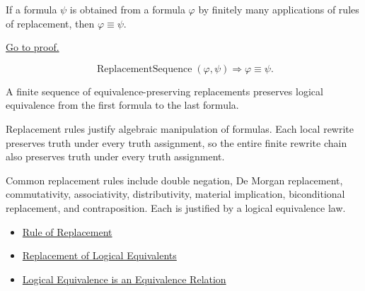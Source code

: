 \begin{tcolorbox}[colback=thmbox, colframe=thmborder, arc=2pt,
  left=6pt, right=6pt, top=4pt, bottom=4pt,
  title={\small\textbf{Theorem (Replacement Rules Preserve Logical Equivalence)}},
  fonttitle=\small\bfseries]
\begin{theorem}
\label{thm:replacement-rules-preserve-logical-equivalence-propositional-logic}
If a formula \(\psi\) is obtained from a formula \(\varphi\) by finitely many
applications of rules of replacement, then \(\varphi\equiv\psi\).

\noindent\hyperref[prf:replacement-rules-preserve-logical-equivalence-propositional-logic]{Go to proof.}
\end{theorem}
\end{tcolorbox}

\begin{remark*}
\[
\operatorname{ReplacementSequence}(\varphi,\psi)
\Longrightarrow
\varphi\equiv\psi.
\]
\end{remark*}

\begin{remark*}
A finite sequence of equivalence-preserving replacements preserves logical
equivalence from the first formula to the last formula.
\end{remark*}

\begin{remark*}[Interpretation]
Replacement rules justify algebraic manipulation of formulas. Each local rewrite
preserves truth under every truth assignment, so the entire finite rewrite chain
also preserves truth under every truth assignment.
\end{remark*}

\begin{remark*}[Exposition]
Common replacement rules include double negation, De Morgan replacement,
commutativity, associativity, distributivity, material implication, biconditional
replacement, and contraposition. Each is justified by a logical equivalence law.
\end{remark*}

\begin{dependencies}
\begin{itemize}
  \item \hyperref[def:rule-of-replacement-propositional-logic]{Rule of Replacement}
  \item \hyperref[thm:replacement-of-logical-equivalents-propositional-logic]{Replacement of Logical Equivalents}
  \item \hyperref[thm:logical-equivalence-equivalence-relation]{Logical Equivalence is an Equivalence Relation}
\end{itemize}
\end{dependencies}
